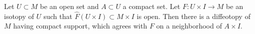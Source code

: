 Let $U \subset M$ be an open set and $A \subset U$ a compact set. Let $F: U \times I \to M$ be an isotopy of $U$ such that $\widehat{F}(U \times I) \subset M \times I$ is open. Then there is a diffeotopy of $M$ having compact support, which agrees with $F$ on a neighborhood of $A \times I$.
